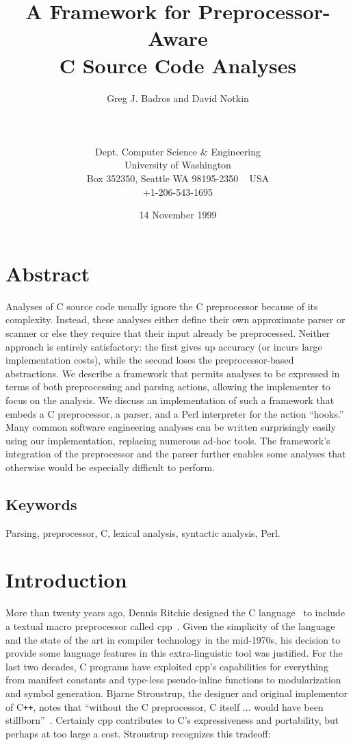 \documentclass{article}
\title{A Framework for Preprocessor-Aware \\ C Source Code Analyses}
\author{
        \hspace*{-2ex}
        \parbox{4in} {\begin{center}
        Greg J. Badros and David Notkin\\
        \end{center}}\\
        \parbox{4in} {\begin{center}
            \begin{small}
              Dept. Computer Science \& Engineering\\
              University of Washington \\
              Box 352350, Seattle WA  98195-2350 ~ USA \\
              +1-206-543-1695\\
              \email{\{gjb,notkin\}@cs.washington.edu}
            \end{small}
        \end{center} }
}
\date{14 November 1999}
\newcommand{\Cpp}{\mbox{\textsf{cpp}}}
\newcommand{\CPP}{\mbox{C\texttt{++}}}
\newcommand{\C}{\mbox{C}}
\begin{document}
\maketitle

\thispagestyle{empty}  %

\pagestyle{plain}

\section*{Abstract}
\label{sec:abstract}
Analyses of \C{} source code usually ignore the \C{} preprocessor
because of its complexity.  Instead, these analyses either define their
own approximate parser or scanner or else they require that their
input already be preprocessed.  Neither approach is entirely
satisfactory: the first gives up accuracy (or incurs large
implementation costs), while the second loses the preprocessor-based
abstractions.  We describe a framework that permits analyses to be
expressed in terms of both preprocessing and parsing actions, allowing
the implementer to focus on the analysis.  We discuss an implementation of
such a framework that embeds a \C{} preprocessor, a parser, and a Perl
interpreter for the action ``hooks.''  Many common software engineering
analyses can be written surprisingly easily using our implementation,
replacing numerous ad-hoc tools.  The framework's integration of the
preprocessor and the parser further enables some analyses that otherwise
would be especially difficult to perform.

\subsection*{Keywords}
Parsing, preprocessor, C, lexical analysis, syntactic analysis, Perl.

\bigskip

\section*{Introduction}
\label{sec:intro}
More than twenty years ago, Dennis Ritchie designed the \C{}
language~\cite{Kernighan88} to include a textual macro preprocessor
called \Cpp{}~\cite[Ch.~3]{Harbison91}.  Given the simplicity of the
language and the state of the art in compiler technology in the
mid-1970s, his decision to provide some language features in this
extra-linguistic tool was justified.  For the last two
decades, \C{} programs have exploited \Cpp{}'s capabilities for
everything from manifest constants and type-less pseudo-inline
functions to modularization and symbol generation.  Bjarne
Stroustrup, the designer and original implementor of \CPP{}, notes that
``without the \C{} preprocessor, \C{} itself $\ldots$ would have been
stillborn''~\cite[p.~119]{Stroustrup94}.  Certainly \Cpp{} contributes
to \C{}'s expressiveness and portability, but perhaps at too large a
cost.  Stroustrup recognizes this tradeoff:
\end{document}
